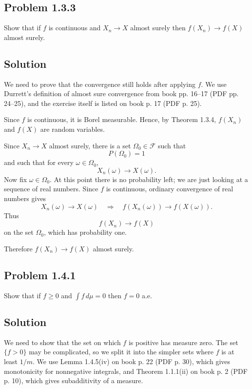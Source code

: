 \documentclass[a4paper,12pt,openany]{article}
\theoremstyle{plain}
\theoremstyle{definition}
\begin{document}
\subsection*{Problem 1.3.3}

Show that if $f$ is continuous and $X_n \to X$ almost surely then $f(X_n) \to f(X)$ almost surely.

\subsection*{Solution}

We need to prove that the convergence still holds after applying $f$. We use Durrett's definition of almost sure convergence from book pp. 16--17 (PDF pp. 24--25), and the exercise itself is listed on book p. 17 (PDF p. 25).

Since $f$ is continuous, it is Borel measurable. Hence, by Theorem 1.3.4, $f(X_n)$ and $f(X)$ are random variables.

\medskip

Since $X_n\to X$ almost surely, there is a set $\Omega_0\in\mathcal{F}$ such that
\[
P(\Omega_0)=1
\]
and such that for every $\omega\in\Omega_0$,
\[
X_n(\omega)\to X(\omega).
\]
Now fix $\omega\in\Omega_0$. At this point there is no probability left; we are just looking at a sequence of real numbers. Since $f$ is continuous, ordinary convergence of real numbers gives
\[
X_n(\omega)\to X(\omega)
\quad\Longrightarrow\quad
f(X_n(\omega))\to f(X(\omega)).
\]
Thus
\[
f(X_n)\to f(X)
\]
on the set $\Omega_0$, which has probability one.

\medskip

Therefore $f(X_n)\to f(X)$ almost surely.

\subsection*{Problem 1.4.1}

Show that if $f \ge 0$ and $\int f\,d\mu = 0$ then $f = 0$ a.e.

\subsection*{Solution}

We need to show that the set on which $f$ is positive has measure zero. The set $\{f>0\}$ may be complicated, so we split it into the simpler sets where $f$ is at least $1/m$. We use Lemma 1.4.5(iv) on book p. 22 (PDF p. 30), which gives monotonicity for nonnegative integrals, and Theorem 1.1.1(ii) on book p. 2 (PDF p. 10), which gives subadditivity of a measure.
\end{document}
